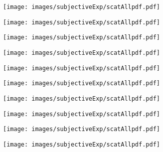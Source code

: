 \documentclass[11pt,a4j,dvipdfmx]{jreport}
\begin{document}
  \clearpage


\begin{figure}[H]
  \centering
  \texttt{[image: images/subjectiveExp/scatAllpdf.pdf]}
\end{figure}

\begin{figure}[H]
  \begin{minipage}[b]{0.5\linewidth}
    \centering
    \texttt{[image: images/subjectiveExp/scatAllpdf.pdf]}
  \end{minipage}%
  \begin{minipage}[b]{0.5\linewidth}
    \centering
    \texttt{[image: images/subjectiveExp/scatAllpdf.pdf]}
  \end{minipage}

  \begin{minipage}[b]{0.5\linewidth}
    \centering
    \texttt{[image: images/subjectiveExp/scatAllpdf.pdf]}
  \end{minipage}%
  \begin{minipage}[b]{0.5\linewidth}
    \centering
    \texttt{[image: images/subjectiveExp/scatAllpdf.pdf]}
  \end{minipage}
\end{figure}

\clearpage


\begin{figure}[H]
  \centering
  \texttt{[image: images/subjectiveExp/scatAllpdf.pdf]}
\end{figure}

\begin{figure}[H]
  \begin{minipage}[b]{0.5\linewidth}
    \centering
    \texttt{[image: images/subjectiveExp/scatAllpdf.pdf]}
  \end{minipage}%
  \begin{minipage}[b]{0.5\linewidth}
    \centering
    \texttt{[image: images/subjectiveExp/scatAllpdf.pdf]}
  \end{minipage}

  \begin{minipage}[b]{0.5\linewidth}
    \centering
    \texttt{[image: images/subjectiveExp/scatAllpdf.pdf]}
  \end{minipage}%
  \begin{minipage}[b]{0.5\linewidth}
    \centering
    \texttt{[image: images/subjectiveExp/scatAllpdf.pdf]}
  \end{minipage}
\end{figure}
\end{document}
